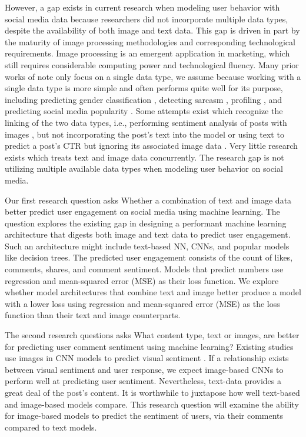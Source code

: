 \documentclass[mksc,blindrev]{informs3} %
\begin{document}
However, a gap exists in current research when modeling user behavior with social media data because researchers did not incorporate multiple data types, despite the availability of both image and text data. This gap is driven in part by the maturity of image processing methodologies and corresponding technological requirements. Image processing is an emergent application in marketing, which still requires considerable computing power and technological fluency. Many prior works of note only focus on a single data type, we assume because working with a single data type is more simple and often performs quite well for its purpose, including predicting gender classification \cite{Hassner2015}, detecting sarcasm \cite{Poria2016}, profiling \cite{Segalin2017}, and predicting social media popularity \cite{Gelli2015}. Some attempts exist which recognize the linking of the two data types, i.e., performing sentiment analysis of posts with images \cite{Wang2015}, but not incorporating the post’s text into the model or using text to predict a post’s CTR but ignoring its associated image data \cite{Hudson2020}. Very little research exists which treats text and image data concurrently. The research gap is not utilizing multiple available data types when modeling user behavior on social media.

Our first research question asks Whether a combination of text and image data better predict user engagement on social media using machine learning. The question explores the existing gap in designing a performant machine learning architecture that digests both image and text data to predict user engagement. Such an architecture might include text-based NN, CNNs, and popular models like decision trees. The predicted user engagement consists of the count of likes, comments, shares, and comment sentiment. Models that predict numbers use regression and mean-squared error (MSE) as their loss function. We explore whether model architectures that combine text and image better produce a model with a lower loss using regression and mean-squared error (MSE) as the loss function than their text and image counterparts. 

The second research questions asks What content type, text or images, are better for predicting user comment sentiment using machine learning? Existing studies use images in CNN models to predict visual sentiment \cite{Segalin2017, Xu2014}. If a relationship exists between visual sentiment and user response, we expect image-based CNNs to perform well at predicting user sentiment. Nevertheless, text-data provides a great deal of the post's content. It is worthwhile to juxtapose how well text-based and image-based models compare. This research question will examine the ability for image-based models to predict the sentiment of users, via their comments compared to text models.
\end{document}
